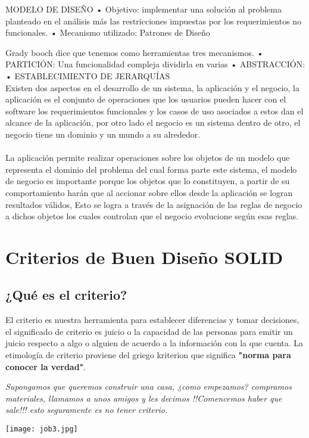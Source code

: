 \documentclass[12pt]{book}
\begin{document}
MODELO DE DISEÑO 
• Objetivo: implementar una solución al problema planteado en el análisis más las restricciones impuestas por los requerimientos no funcionales. 
• Mecanismo utilizado: Patrones de Diseño 


Grady booch dice que tenemos como herramientas tres mecanismos.
    • PARTICIÓN: Una funcionalidad compleja dividirla en varias 
    • ABSTRACCIÓN: 
    • ESTABLECIMIENTO DE JERARQUÍAS
\\
Existen dos aspectos en el desarrollo de un sistema, la aplicación y el negocio, la aplicación es el conjunto de operaciones que los usuarios pueden hacer con el software los requerimientos funcionales y los casos de uso asociados a estos dan el alcance de la aplicación, por otro lado el negocio es un sistema dentro de otro, el negocio tiene un dominio y un mundo a su alrededor.
\\
\\
La aplicación permite realizar operaciones sobre los objetos de un modelo que representa el dominio del problema del cual forma parte este sistema, el modelo de negocio es importante porque los objetos que lo constituyen, a partir de su comportamiento harán que al accionar sobre ellos desde la aplicación se logran resultados válidos, Esto se logra a través de la asignación de las reglas de negocio a dichos objetos los cuales controlan que el negocio evolucione según esas reglas.



\chapter{Criterios de Buen Diseño SOLID}
\section{¿Qué es el criterio?} 
El criterio es nuestra herramienta para establecer diferencias y tomar decisiones, el significado de criterio es juicio o la capacidad de las personas para emitir un juicio respecto a algo o alguien de acuerdo a la información con la que cuenta. La etimología de criterio proviene del griego kriterion que significa \textbf{"norma para conocer la verdad"}.
\begin{center}
\textit{Supongamos que queremos construir una casa, ¿como empezamos? compramos materiales, llamamos a unos amigos y les decimos !!Comencemos haber que sale!!! esto seguramente es no tener criterio.
}\end{center}
\begin{center}
\texttt{[image: job3.jpg]}
\end{center}
\end{document}
